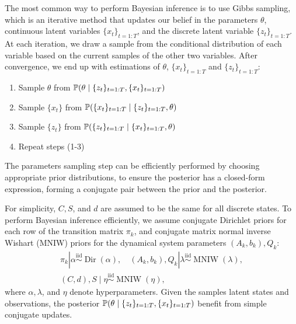 The most common way to perform Bayesian inference is to use Gibbs sampling, which is an iterative method that updates our belief in the parameters $\theta$, continuous latent variables $\{x_{t}\}_{t=1:T}$, and the discrete latent variable $\{z_t\}_{t=1:T}$. At each iteration, we draw a sample from the conditional distribution of each variable based on the current samples of the other two variables. After convergence, we end up with estimations of $\theta$, $\{x_{t}\}_{t=1:T}$ and $\{z_t\}_{t=1:T}$:
\begin{enumerate}
  \item Sample $\theta$ from $\mathbb{P}(\theta \mid \{z_t\}_{t=1:T}, \{x_{t}\}_{t=1:T})$
  \item Sample $\{x_t\}$ from $\mathbb{P}(\{x_{t}\}_{t=1:T} \mid \{z_t\}_{t=1:T}, \theta)$
  \item Sample $\{z_t\}$ from $\mathbb{P}(\{z_{t}\}_{t=1:T} \mid \{x_t\}_{t=1:T}, \theta)$
 \item Repeat steps (1-3) 
\end{enumerate}
The parameters sampling step can be efficiently performed by choosing appropriate prior distributions, to ensure the posterior has a closed-form expression, forming a conjugate pair between the prior and the posterior.
 
For simplicity, $C, S$, and $d$ are assumed to be the same for all discrete states. To perform Bayesian inference efficiently, we assume conjugate Dirichlet priors for each row of the transition matrix $\pi_{k}$, and conjugate matrix normal inverse Wishart (MNIW) priors for the dynamical system parameters $\left(A_{k}, b_{k}\right), Q_{k}$:
$$
\begin{gathered}
\pi_{k}\left|\alpha \stackrel{\mathrm{iid}}{\sim} \operatorname{Dir}(\alpha), \quad\left(A_{k}, b_{k}\right), Q_{k}\right| \lambda \stackrel{\mathrm{iid}}{\sim} \operatorname{MNIW}(\lambda), \\
\left(C, d\right), S \mid \eta \stackrel{\mathrm{iid}}{\sim} \operatorname{MNIW}(\eta),
\end{gathered}
$$
where $\alpha, \lambda$, and $\eta$ denote hyperparameters. 
Given the samples latent states and observations, the posterior $\mathbb{P}(\theta \mid \{z_t\}_{t=1:T}, \{x_{t}\}_{t=1:T})$ benefit from simple conjugate updates. 


